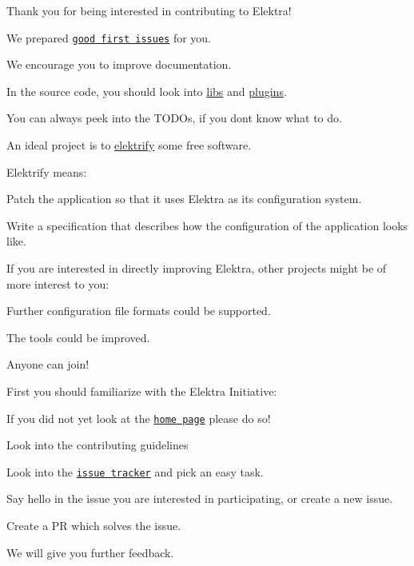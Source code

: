 Thank you for being interested in contributing to Elektra!

We prepared \href{https://github.com/ElektraInitiative/libelektra/issues?q=is%3Aissue+is%3Aopen+label%3A%22good+first+issue%22}{\tt good first issues} for you.


\begin{DoxyItemize}
\item We encourage you to improve documentation.
\item In the source code, you should look into \hyperlink{src_libs_README_md}{libs} and \hyperlink{src_plugins_README_md}{plugins}.
\item You can always peek into the T\+O\+D\+Os, if you don\textquotesingle{}t know what to do.
\item An ideal project is to \hyperlink{doc_help_elektra-glossary_md}{elektrify} some free software.
\end{DoxyItemize}

Elektrify means\+:


\begin{DoxyItemize}
\item Patch the application so that it uses Elektra as its configuration system.
\item Write a specification that describes how the configuration of the application looks like.
\end{DoxyItemize}

If you are interested in directly improving Elektra, other projects might be of more interest to you\+:


\begin{DoxyItemize}
\item Further configuration file formats could be supported.
\item The tools could be improved.
\end{DoxyItemize}

Anyone can join!

First you should familiarize with the Elektra Initiative\+:


\begin{DoxyItemize}
\item If you did not yet look at the \href{https://www.libelektra.org/}{\tt home page} please do so!
\item Look into the contributing guidelines
\item Look into the \href{https://issues.libelektra.org/}{\tt issue tracker} and pick an easy task.
\item Say hello in the issue you are interested in participating, or create a new issue.
\item Create a PR which solves the issue.
\item We will give you further feedback. 
\end{DoxyItemize}